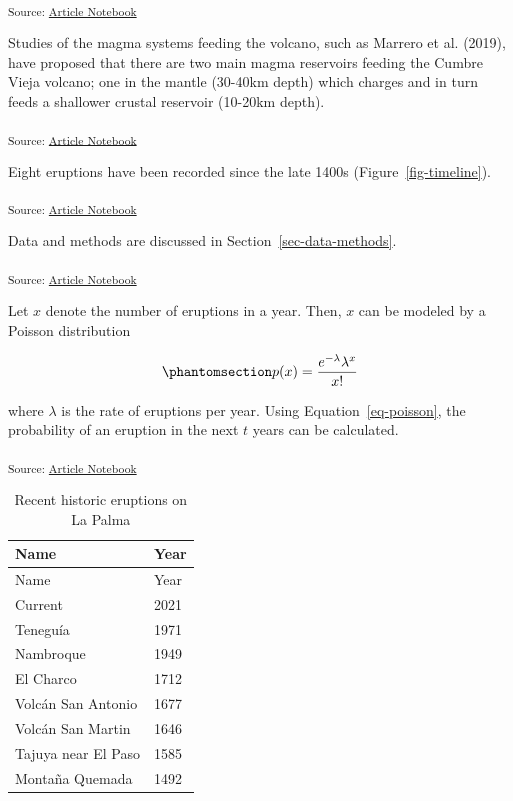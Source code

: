 \documentclass[
]{agujournal2019}
\begin{document}
\textsubscript{Source:
\href{https://wbarfuss.github.io/test-quartoms/index.ipynb.html}{Article
Notebook}}

Studies of the magma systems feeding the volcano, such as Marrero et al.
(2019), have proposed that there are two main magma reservoirs feeding
the Cumbre Vieja volcano; one in the mantle (30-40km depth) which
charges and in turn feeds a shallower crustal reservoir (10-20km depth).

\textsubscript{Source:
\href{https://wbarfuss.github.io/test-quartoms/index.ipynb.html}{Article
Notebook}}

Eight eruptions have been recorded since the late 1400s
(Figure~\ref{fig-timeline}).

\textsubscript{Source:
\href{https://wbarfuss.github.io/test-quartoms/index.ipynb.html}{Article
Notebook}}

Data and methods are discussed in Section~\ref{sec-data-methods}.

\textsubscript{Source:
\href{https://wbarfuss.github.io/test-quartoms/index.ipynb.html}{Article
Notebook}}

Let \(x\) denote the number of eruptions in a year. Then, \(x\) can be
modeled by a Poisson distribution

\begin{equation}\phantomsection\label{eq-poisson}{
p(x) = \frac{e^{-\lambda} \lambda^{x}}{x !}
}\end{equation}

where \(\lambda\) is the rate of eruptions per year. Using
Equation~\ref{eq-poisson}, the probability of an eruption in the next
\(t\) years can be calculated.

\textsubscript{Source:
\href{https://wbarfuss.github.io/test-quartoms/index.ipynb.html}{Article
Notebook}}

\begin{longtable}[]{@{}ll@{}}
\caption{Recent historic eruptions on La
Palma}\label{tbl-history}\tabularnewline
\toprule\noalign{}
Name & Year \\
\midrule\noalign{}
\endfirsthead
\toprule\noalign{}
Name & Year \\
\midrule\noalign{}
\endhead
\bottomrule\noalign{}
\endlastfoot
Current & 2021 \\
Teneguía & 1971 \\
Nambroque & 1949 \\
El Charco & 1712 \\
Volcán San Antonio & 1677 \\
Volcán San Martin & 1646 \\
Tajuya near El Paso & 1585 \\
Montaña Quemada & 1492 \\
\end{longtable}
\end{document}
